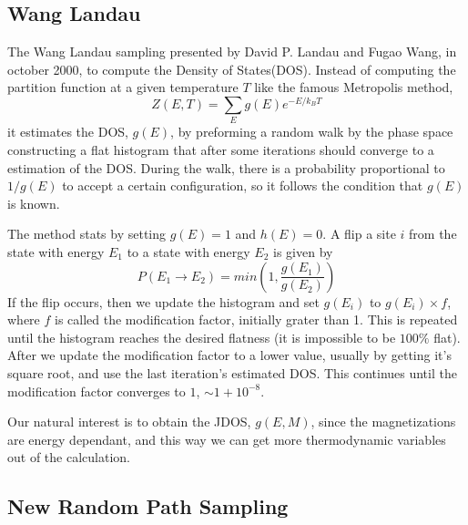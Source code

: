 \documentclass[a4paper, 11pt]{article}
\begin{document}
	\subsection{Wang Landau}
	
	The Wang Landau sampling \cite{WL_original} presented by David P. Landau and Fugao Wang, in october 2000, to compute the Density of States(DOS). Instead of computing the partition function at a given temperature $T$ like the famous Metropolis method\cite{metropolis}, 
	\begin{equation*}
		Z(E, T) = \sum_E g(E)e^{-E/k_BT}
	\end{equation*}
	it estimates the DOS, $g(E)$, by preforming a random walk by the phase space constructing a flat histogram that after some iterations should converge to a estimation of the DOS. During the walk, there is a probability proportional to $1/g(E)$ to accept a certain configuration, so it follows the condition that $g(E)$ is known.
	
	The method stats by setting $g(E)=1$ and $h(E)=0$. A flip a site $i$ from the state with energy $E_1$ to a state with energy $E_2$ is given by
	\begin{equation*}
		P(E_1\rightarrow E_2)=min\left(1, \frac{g(E_1)}{g(E_2)}\right)
	\end{equation*}
	If the flip occurs, then we update the histogram and set $g(E_i)$ to $g(E_i)\times f$, where $f$ is called the modification factor, initially grater than 1. This is repeated until the histogram reaches the desired flatness (it is impossible to be $100\%$ flat).
	After we update the modification factor to a lower value, usually by getting it's square root, and use the last iteration's estimated DOS. This continues until the modification factor converges to $1$, $\sim 1 + 10^{-8}$.

	Our natural interest is to obtain the JDOS\cite{JDOS_easy, JDOS_diff}, $g(E, M)$, since the magnetizations are energy dependant, and this way we can get more thermodynamic variables out of the calculation.
	
	\subsection{New Random Path Sampling}
	
\end{document}

